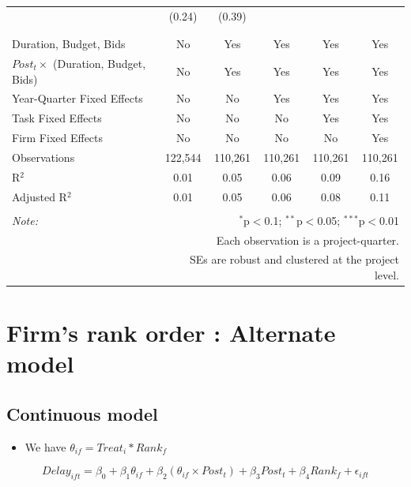 \documentclass[
]{article}
\providecommand{\tightlist}{%
  \setlength{\itemsep}{0pt}\setlength{\parskip}{0pt}}
\begin{document}
\begin{table}[H]
\begin{tabular}{@{\extracolsep{-2pt}}lccccc}
  & (0.24) & (0.39) &  &  &  \\ 
  & & & & & \\ 
\hline \\[-1.8ex] 
Duration, Budget, Bids & No & Yes & Yes & Yes & Yes \\ 
$Post_t \times$  (Duration, Budget, Bids) & No & Yes & Yes & Yes & Yes \\ 
Year-Quarter Fixed Effects & No & No & Yes & Yes & Yes \\ 
Task Fixed Effects & No & No & No & Yes & Yes \\ 
Firm Fixed Effects & No & No & No & No & Yes \\ 
Observations & 122,544 & 110,261 & 110,261 & 110,261 & 110,261 \\ 
R$^{2}$ & 0.01 & 0.05 & 0.06 & 0.09 & 0.16 \\ 
Adjusted R$^{2}$ & 0.01 & 0.05 & 0.06 & 0.08 & 0.11 \\ 
\hline 
\hline \\[-1.8ex] 
\textit{Note:}  & \multicolumn{5}{r}{$^{*}$p$<$0.1; $^{**}$p$<$0.05; $^{***}$p$<$0.01} \\ 
 & \multicolumn{5}{r}{Each observation is a project-quarter.} \\ 
 & \multicolumn{5}{r}{SEs are robust and clustered at the project level.} \\ 
\end{tabular} 
\end{table}

\hypertarget{firms-rank-order-alternate-model}{%
\section{Firm's rank order : Alternate
model}\label{firms-rank-order-alternate-model}}

\hypertarget{continuous-model}{%
\subsection{Continuous model}\label{continuous-model}}

\begin{itemize}
\tightlist
\item
  We have \(\theta_{if} = Treat_i * Rank_f\)
\end{itemize}

\[ Delay_{ift} = \beta_0 + \beta_1 \theta_{if} + \beta_2 (\theta_{if} \times Post_t) + \beta_3 Post_t + \beta_4 Rank_f + \epsilon_{ift} \]
\end{document}
